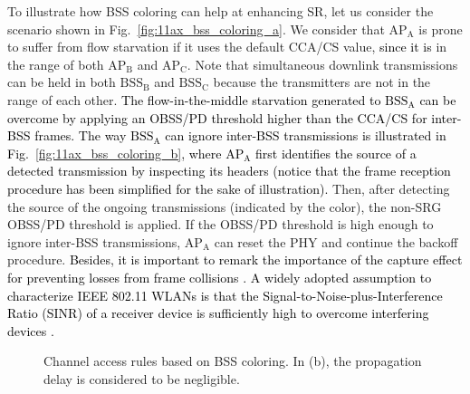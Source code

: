 \documentclass[preprint,12pt]{elsarticle}
\begin{document}
To illustrate how BSS coloring can help at enhancing SR, let us consider the scenario shown in Fig.~\ref{fig:11ax_bss_coloring_a}. We consider that $\text{AP}_\text{A}$ is prone to suffer from flow starvation if it uses the default CCA/CS value, \textcolor{black}{since it is} in the range of both $\text{AP}_\text{B}$ and $\text{AP}_\text{C}$. Note that simultaneous downlink transmissions can be held in both $\text{BSS}_\text{B}$ and $\text{BSS}_\text{C}$ because the transmitters are not in the range of each other. \textcolor{black}{The flow-in-the-middle starvation generated to $\text{BSS}_\text{A}$ can be overcome by applying an OBSS/PD threshold higher than the CCA/CS for inter-BSS frames. The way $\text{BSS}_\text{A}$ can ignore inter-BSS transmissions is illustrated in Fig.~\ref{fig:11ax_bss_coloring_b}, where $\text{AP}_\text{A}$ first identifies the source of a detected transmission by inspecting its headers (notice that the frame reception procedure has been simplified for the sake of illustration).} Then, after detecting the source of the ongoing transmissions (indicated by the color), the non-SRG OBSS/PD threshold is applied. If the OBSS/PD threshold is high enough to ignore inter-BSS transmissions, $\text{AP}_\text{A}$ can reset the PHY and continue the backoff procedure. \textcolor{black}{Besides, it is important to remark the importance of the capture effect for preventing losses from frame collisions \cite{lee2007experimental}. A widely adopted assumption to characterize IEEE 802.11 WLANs is that the Signal-to-Noise-plus-Interference Ratio (SINR) of a receiver device is sufficiently high to overcome interfering devices \cite{durvy2007modeling}.}

\begin{figure}[ht!]
	\centering
	\hspace{1cm}
	\caption{Channel access rules based on BSS coloring. In (b), the propagation delay is considered to be negligible.}
\end{figure}
\end{document}
